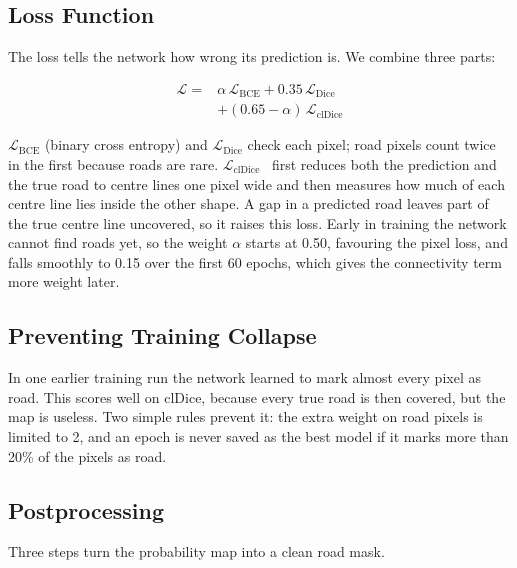 \documentclass{ieeeaccess}
\begin{document}
\subsection{Loss Function}

The loss tells the network how wrong its prediction is. We combine three parts:

\begin{equation}
\begin{split}
\mathcal{L} ={}& \alpha\,\mathcal{L}_{\mathrm{BCE}} + 0.35\,\mathcal{L}_{\mathrm{Dice}}\\
&+ (0.65 - \alpha)\,\mathcal{L}_{\mathrm{clDice}}
\end{split}
\label{eq:loss}
\end{equation}

$\mathcal{L}_{\mathrm{BCE}}$ (binary cross entropy) and $\mathcal{L}_{\mathrm{Dice}}$ check each pixel; road pixels count twice in the first because roads are rare. $\mathcal{L}_{\mathrm{clDice}}$~\cite{shit2021cldice} first reduces both the prediction and the true road to centre lines one pixel wide and then measures how much of each centre line lies inside the other shape. A gap in a predicted road leaves part of the true centre line uncovered, so it raises this loss. Early in training the network cannot find roads yet, so the weight $\alpha$ starts at 0.50, favouring the pixel loss, and falls smoothly to 0.15 over the first 60 epochs, which gives the connectivity term more weight later.

\subsection{Preventing Training Collapse}

In one earlier training run the network learned to mark almost every pixel as road. This scores well on clDice, because every true road is then covered, but the map is useless. Two simple rules prevent it: the extra weight on road pixels is limited to 2, and an epoch is never saved as the best model if it marks more than 20\% of the pixels as road.

\subsection{Postprocessing}

Three steps turn the probability map into a clean road mask.
\end{document}
